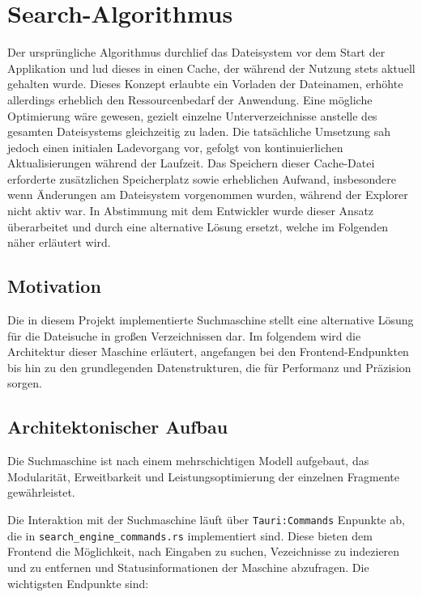 \section{Search-Algorithmus}

Der ursprüngliche Algorithmus durchlief das Dateisystem vor dem Start der Applikation und lud dieses in einen Cache, der während
der Nutzung stets aktuell gehalten wurde. Dieses Konzept erlaubte ein Vorladen der Dateinamen, erhöhte allerdings erheblich den
Ressourcenbedarf der Anwendung. Eine mögliche Optimierung wäre gewesen, gezielt einzelne Unterverzeichnisse anstelle des gesamten
Dateisystems gleichzeitig zu laden. Die tatsächliche Umsetzung sah jedoch einen initialen Ladevorgang vor, gefolgt von
kontinuierlichen Aktualisierungen während der Laufzeit. Das Speichern dieser Cache-Datei erforderte zusätzlichen Speicherplatz
sowie erheblichen Aufwand, insbesondere wenn Änderungen am Dateisystem vorgenommen wurden, während der Explorer nicht aktiv war.
In Abstimmung mit dem Entwickler wurde dieser Ansatz überarbeitet und durch eine alternative Lösung ersetzt, welche im Folgenden
näher erläutert wird. 

\subsection{Motivation}

Die in diesem Projekt implementierte Suchmaschine stellt eine alternative Lösung für die Dateisuche in großen Verzeichnissen dar.
Im folgendem wird die Architektur dieser Maschine erläutert, angefangen bei den Frontend-Endpunkten bis hin zu den grundlegenden
Datenstrukturen, die für Performanz und Präzision sorgen. 

\subsection{Architektonischer Aufbau} Die Suchmaschine ist nach einem
mehrschichtigen Modell aufgebaut, das Modularität, Erweitbarkeit und Leistungsoptimierung der einzelnen Fragmente gewährleistet.

Die Interaktion mit der Suchmaschine läuft über \verb|Tauri:Commands| Enpunkte ab, die in \newline \verb|search_engine_commands.rs|
implementiert sind. Diese bieten dem Frontend die Möglichkeit, nach Eingaben zu suchen, Vezeichnisse zu indezieren und zu
entfernen und Statusinformationen der Maschine abzufragen. Die wichtigsten Endpunkte sind: 

